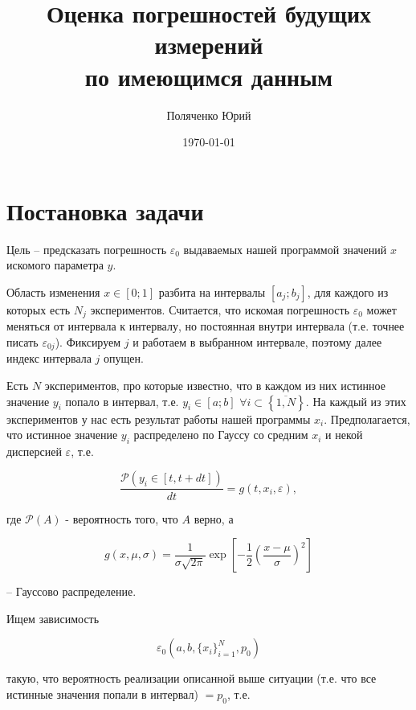 \documentclass[a4paper,12pt]{article} %
\author{Поляченко Юрий}
\title{Оценка погрешностей будущих измерений \\ по имеющимся данным}
\date{\today}
\begin{document}

\clearpage\maketitle
\thispagestyle{empty}

\newpage

\section{Постановка задачи}

Цель -- предсказать погрешность $\varepsilon_0$ выдаваемых нашей программой значений $x$ искомого параметра $y$.

Область изменения $x \in [0;1]$ разбита на интервалы $[a_j; b_j]$, для каждого из которых есть $N_j$ экспериментов. Считается, что искомая погрешность $\varepsilon_0$ может меняться от интервала к интервалу, но постоянная внутри интервала (т.е. точнее писать $\varepsilon_{0j}$). Фиксируем $j$ и работаем в выбранном интервале, поэтому далее индекс интервала $j$ опущен.

Есть $N$ экспериментов, про которые известно, что в каждом из них истинное значение $y_i$ попало в интервал, т.е. $y_i \in [a;b]$ $\forall i \subset \left\{\overline{1,N}\right\}$. На каждый из этих экспериментов у нас есть результат работы нашей программы $x_i$. Предполагается, что истинное значение $y_{i}$ распределено по Гауссу со средним $x_i$ и некой дисперсией $\varepsilon$, т.е.

\begin{equation}
\dfrac{\mathcal{P}(y_i \in [t, t+dt])}{dt} = g(t, x_i, \varepsilon), 
\end{equation}

где $\mathcal{P}(A)$ - вероятность того, что $A$ верно, а

\begin{equation}
g(x, \mu, \sigma) = \dfrac{1}{\sigma \sqrt{2 \pi}} \exp{\left[ - \dfrac{1}{2} \left( \dfrac{x - \mu}{\sigma} \right)^2 \right]}
\end{equation}

-- Гауссово распределение.

Ищем зависимость

\begin{equation}
\varepsilon_0 \left( a, b, \{x_i\}_{i = 1}^{N}, p_0 \right)
\end{equation}

такую, что вероятность реализации описанной выше ситуации (т.е. что все истинные значения попали в интервал) $ = p_0$, т.е.
\end{document}
